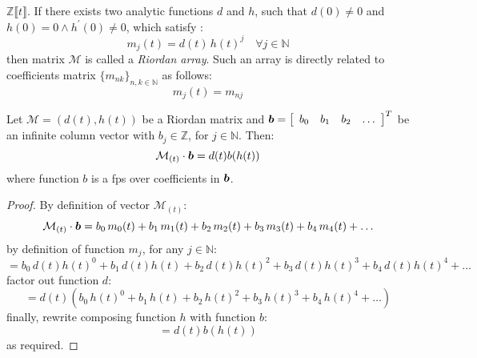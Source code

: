 $\mathbb{Z}\llbracket t \rrbracket$. If there exists two analytic functions $d$
and $h$, such that $d(0)\neq0$ and $h(0)=0 \wedge h^{\prime}(0)\neq0$, which
satisfy :
\begin{displaymath}
    m_{j}(t)=d(t)\,h(t)^{j} \quad \forall j\in\mathbb{N}
\end{displaymath}
then matrix $\mathcal{M}$ is called a \emph{Riordan array}. Such an array is
directly related to coefficients matrix $\lbrace m_{nk}\rbrace_{n,k\in\mathbb{N}}$ as follows:
\begin{displaymath}
    [t^{n}]m_{j}(t)=m_{nj}
\end{displaymath}


\begin{theorem}
    Let $\mathcal{M}=(d(t),h(t))$ be a Riordan matrix and $\boldsymbol{b}=
    \left[\begin{array}{cccc}b_{0}&b_{1}&b_{2}&\ldots\end{array}\right]^{T}$ 
    be an infinite column vector with $b_{j}\in\mathbb{Z}$, for $j\in\mathbb{N}$. Then:
    \begin{displaymath}
        \mathcal{M}_{(t)}\cdot\boldsymbol{b}=d(t)b(h(t))
    \end{displaymath}
    where function $b$ is a \ac{fps} over coefficients in $\boldsymbol{b}$.
    \label{thm:riordan:group:fundamental:theorem}
\end{theorem}
\begin{proof}
    By definition of vector $\mathcal{M}_{(t)}$:
    \begin{displaymath}
        \mathcal{M}_{(t)}\cdot\boldsymbol{b}= b_{0}\,m_{0}(t) + b_{1}\,m_{1}(t) + b_{2}\,m_{2}(t) 
            + b_{3}\,m_{3}(t) + b_{4}\,m_{4}(t) + \ldots
    \end{displaymath}
    by definition of function $m_{j}$, for any $j\in\mathbb{N}$:
    \begin{displaymath}
        = b_{0}\,d(t)h(t)^{0} + b_{1}\,d(t)h(t) + b_{2}\,d(t)h(t)^{2} 
            + b_{3}\,d(t)h(t)^{3} + b_{4}\,d(t)h(t)^{4} + \ldots
    \end{displaymath}
    factor out function $d$:
    \begin{displaymath}
        = d(t)\left(b_{0}\,h(t)^{0} + b_{1}\,h(t) + b_{2}\,h(t)^{2} 
            + b_{3}\,h(t)^{3} + b_{4}\,h(t)^{4} + \ldots\right)
    \end{displaymath}
    finally, rewrite composing function $h$ with function $b$:
    \begin{displaymath}
        = d(t)b(h(t))  
    \end{displaymath}
    as required.

\end{proof}

